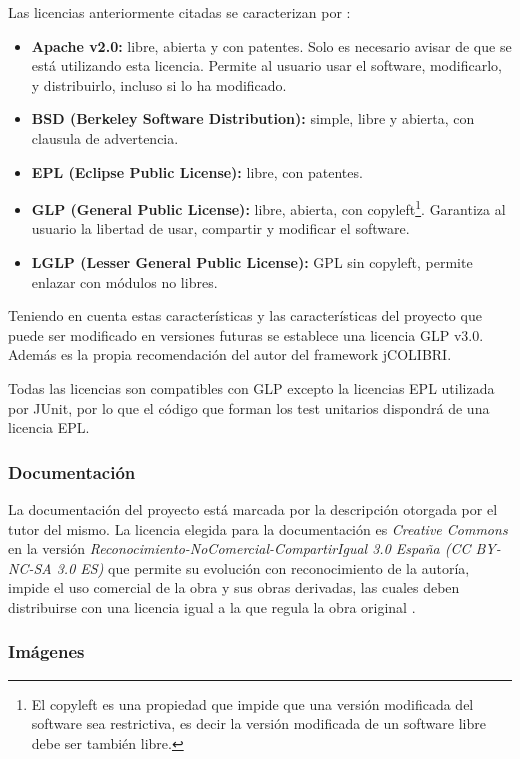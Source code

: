 Las licencias anteriormente citadas se caracterizan por \cite{lic:tipos}:

\begin{itemize}
\tightlist
\item
\textbf{Apache v2.0:} libre, abierta y con patentes. Solo es necesario avisar de que se está utilizando esta licencia. Permite al usuario usar el software, modificarlo, y distribuirlo, incluso si lo ha modificado.
\item
\textbf{BSD (Berkeley Software Distribution):} simple, libre y abierta, con clausula de advertencia.
\item
\textbf{EPL (Eclipse Public License):} libre, con patentes.
\item
\textbf{GLP (General Public License):} libre, abierta, con copyleft\footnote{El copyleft es una propiedad que impide que una versión modificada del software sea restrictiva, es decir la versión modificada de un software libre debe ser también libre.}. Garantiza al usuario la libertad de usar, compartir y modificar el software.
\item
\textbf{LGLP (Lesser General Public License):} GPL sin copyleft, permite enlazar con módulos no libres.
\end{itemize}

Teniendo en cuenta estas características y las características del proyecto que puede ser modificado en versiones futuras se establece una licencia GLP v3.0. Además es la propia recomendación del autor del framework jCOLIBRI.

Todas las licencias son compatibles con GLP \cite{lic:compgnu} excepto la licencias EPL utilizada por JUnit, por lo que el código que forman los test unitarios dispondrá de una licencia EPL.

\subsubsection{Documentación}

La documentación del proyecto está marcada por la descripción otorgada por el tutor del mismo. La licencia elegida para la documentación es \emph{Creative Commons} en la versión \emph{Reconocimiento-NoComercial-CompartirIgual 3.0 España (CC BY-NC-SA 3.0 ES)} que permite su evolución con reconocimiento de la autoría, impide el uso comercial de la obra y sus obras derivadas, las cuales deben distribuirse con una licencia igual a la que regula la obra original \cite{cc:ncsa}.

\subsubsection{Imágenes}

